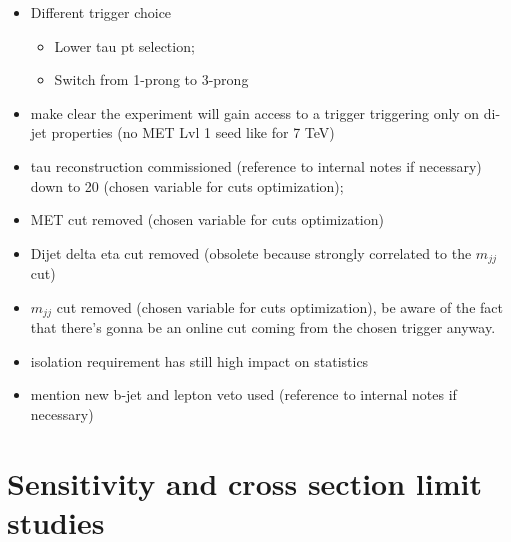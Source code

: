 \begin{itemize}
	\item Different trigger choice 
	\begin{itemize}
		\item  Lower tau pt selection;
		\item Switch from 1-prong to 3-prong
	\end{itemize}
	\item make clear the experiment will gain access to a trigger triggering only on di-jet properties (no MET Lvl 1 seed like for 7 TeV)
	\item tau reconstruction commissioned (reference to internal notes if necessary) down to 20 \gev (chosen variable for cuts optimization);
	\item MET cut removed (chosen variable for cuts optimization)
	\item Dijet delta eta cut removed (obsolete because strongly correlated to the $m_{jj}$ cut) 
	\item $m_{jj}$ cut removed (chosen variable for cuts optimization), be aware of the fact that there's gonna be an online cut coming from the chosen trigger anyway.
	\item \hadtau isolation requirement has still high impact on statistics
	\item mention new b-jet and lepton veto used (reference to internal notes if necessary)
\end{itemize}

\section{Sensitivity and cross section limit studies}

